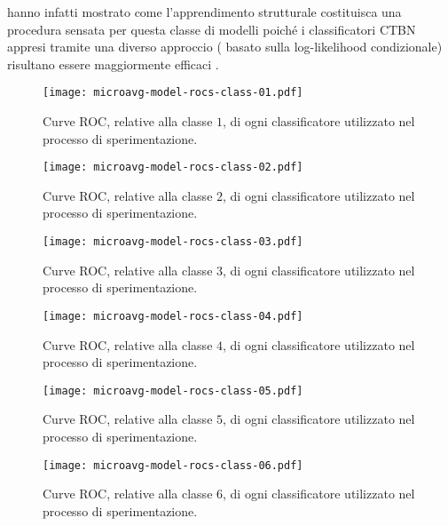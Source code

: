 \citet{Codecasa2013} hanno infatti mostrato come l'apprendimento strutturale costituisca una procedura sensata per questa classe di modelli poiché i classificatori \acs{CTBN} appresi tramite una diverso approccio (\ie{} basato sulla log-likelihood condizionale) risultano essere maggiormente efficaci .

\begin{figure}[ht]
	\centering
	\texttt{[image: microavg-model-rocs-class-01.pdf]}
	\caption[Curve \acs{ROC} relative alla classe $1$]{Curve \acs{ROC}, relative alla classe $1$, di ogni classificatore utilizzato nel processo di sperimentazione.}
	\label{fig:roc-curves-class-1}
\end{figure}

\begin{figure}
	\centering
	\texttt{[image: microavg-model-rocs-class-02.pdf]}
	\caption[Curve \acs{ROC} relative alla classe $2$]{Curve \acs{ROC}, relative alla classe $2$, di ogni classificatore utilizzato nel processo di sperimentazione.}
	\label{fig:roc-curves-class-2}
\end{figure}

\begin{figure}
	\centering
	\texttt{[image: microavg-model-rocs-class-03.pdf]}
	\caption[Curve \acs{ROC} relative alla classe $3$]{Curve \acs{ROC}, relative alla classe $3$, di ogni classificatore utilizzato nel processo di sperimentazione.}
	\label{fig:roc-curves-class-3}
\end{figure}

\begin{figure}
	\centering
	\texttt{[image: microavg-model-rocs-class-04.pdf]}
	\caption[Curve \acs{ROC} relative alla classe $4$]{Curve \acs{ROC}, relative alla classe $4$, di ogni classificatore utilizzato nel processo di sperimentazione.}
	\label{fig:roc-curves-class-4}
\end{figure}

\begin{figure}
	\centering
	\texttt{[image: microavg-model-rocs-class-05.pdf]}
	\caption[Curve \acs{ROC} relative alla classe $5$]{Curve \acs{ROC}, relative alla classe $5$, di ogni classificatore utilizzato nel processo di sperimentazione.}
	\label{fig:roc-curves-class-5}
\end{figure}

\begin{figure}
	\centering
	\texttt{[image: microavg-model-rocs-class-06.pdf]}
	\caption[Curve \acs{ROC} relative alla classe $6$]{Curve \acs{ROC}, relative alla classe $6$, di ogni classificatore utilizzato nel processo di sperimentazione.}
	\label{fig:roc-curves-class-6}
\end{figure}
